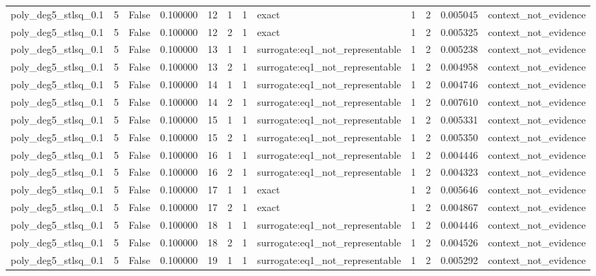 \begin{tabular}{lrrrrrrlrrrl}
poly\_deg5\_stlsq\_0.1 & 5 & False & 0.100000 & 12 & 1 & 1 & exact & 1 & 2 & 0.005045 & context\_not\_evidence \\
poly\_deg5\_stlsq\_0.1 & 5 & False & 0.100000 & 12 & 2 & 1 & exact & 1 & 2 & 0.005325 & context\_not\_evidence \\
poly\_deg5\_stlsq\_0.1 & 5 & False & 0.100000 & 13 & 1 & 1 & surrogate:eq1\_not\_representable & 1 & 2 & 0.005238 & context\_not\_evidence \\
poly\_deg5\_stlsq\_0.1 & 5 & False & 0.100000 & 13 & 2 & 1 & surrogate:eq1\_not\_representable & 1 & 2 & 0.004958 & context\_not\_evidence \\
poly\_deg5\_stlsq\_0.1 & 5 & False & 0.100000 & 14 & 1 & 1 & surrogate:eq1\_not\_representable & 1 & 2 & 0.004746 & context\_not\_evidence \\
poly\_deg5\_stlsq\_0.1 & 5 & False & 0.100000 & 14 & 2 & 1 & surrogate:eq1\_not\_representable & 1 & 2 & 0.007610 & context\_not\_evidence \\
poly\_deg5\_stlsq\_0.1 & 5 & False & 0.100000 & 15 & 1 & 1 & surrogate:eq1\_not\_representable & 1 & 2 & 0.005331 & context\_not\_evidence \\
poly\_deg5\_stlsq\_0.1 & 5 & False & 0.100000 & 15 & 2 & 1 & surrogate:eq1\_not\_representable & 1 & 2 & 0.005350 & context\_not\_evidence \\
poly\_deg5\_stlsq\_0.1 & 5 & False & 0.100000 & 16 & 1 & 1 & surrogate:eq1\_not\_representable & 1 & 2 & 0.004446 & context\_not\_evidence \\
poly\_deg5\_stlsq\_0.1 & 5 & False & 0.100000 & 16 & 2 & 1 & surrogate:eq1\_not\_representable & 1 & 2 & 0.004323 & context\_not\_evidence \\
poly\_deg5\_stlsq\_0.1 & 5 & False & 0.100000 & 17 & 1 & 1 & exact & 1 & 2 & 0.005646 & context\_not\_evidence \\
poly\_deg5\_stlsq\_0.1 & 5 & False & 0.100000 & 17 & 2 & 1 & exact & 1 & 2 & 0.004867 & context\_not\_evidence \\
poly\_deg5\_stlsq\_0.1 & 5 & False & 0.100000 & 18 & 1 & 1 & surrogate:eq1\_not\_representable & 1 & 2 & 0.004446 & context\_not\_evidence \\
poly\_deg5\_stlsq\_0.1 & 5 & False & 0.100000 & 18 & 2 & 1 & surrogate:eq1\_not\_representable & 1 & 2 & 0.004526 & context\_not\_evidence \\
poly\_deg5\_stlsq\_0.1 & 5 & False & 0.100000 & 19 & 1 & 1 & surrogate:eq1\_not\_representable & 1 & 2 & 0.005292 & context\_not\_evidence \\

\end{tabular}

